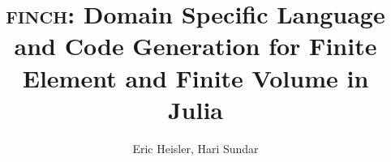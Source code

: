 \documentclass[twoside,leqno,twocolumn]{article}
\begin{document}
%

\newcommand{\FMshop}{\textsc{finch}}


\title{\Large \FMshop: Domain Specific Language and Code Generation for Finite Element and Finite Volume in Julia}
\author{Eric Heisler, Hari Sundar}

\date{}

\maketitle






\end{document}
